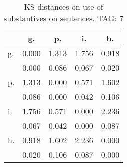 \begin{table}[h!]
\begin{center}
\begin{tabular}{| l | c | c | c | c |}\hline
 & g. & p. & i. & h. \\\hline
g. & 0.000  & 1.313  & 1.756  & 0.918 \\\hline
 & 0.000  & 0.086  & 0.067  & 0.020 \\\hline
p. & 1.313  & 0.000  & 0.571  & 1.602 \\\hline
 & 0.086  & 0.000  & 0.042  & 0.106 \\\hline
i. & 1.756  & 0.571  & 0.000  & 2.236 \\\hline
 & 0.067  & 0.042  & 0.000  & 0.087 \\\hline
h. & 0.918  & 1.602  & 2.236  & 0.000 \\\hline
 & 0.020  & 0.106  & 0.087  & 0.000 \\\hline
\end{tabular}
\caption{KS distances on use of substantives on sentences. TAG: 7}
\end{center}
\end{table}